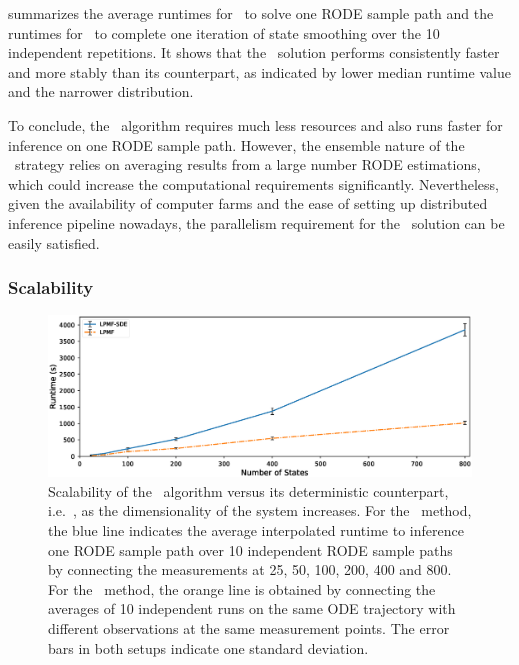  summarizes the average runtimes for \algolpmf\ to solve one RODE sample path and the runtimes for \algovgpamf\ to complete one iteration of state smoothing over the 10 independent repetitions.
It shows that the \algolpmfsde\ solution performs consistently faster and more stably than its counterpart, as indicated by lower median runtime value and the narrower distribution.

To conclude, the \algolpmfsde\ algorithm requires much less resources and also runs faster for inference on one RODE sample path.
However, the ensemble nature of the \algolpmfsde\ strategy relies on averaging results from a large number RODE estimations, which could increase the computational requirements significantly.
Nevertheless, given the availability of computer farms and the ease of setting up distributed inference pipeline nowadays, the parallelism requirement for the \algolpmfsde\ solution can be easily satisfied. 


\subsubsection*{Scalability}

\begin{figure}
    \centering
    \includegraphics[width=\textwidth]{graphics/lorenz-96-scalability}
    \caption{Scalability of the \algolpmfsde\ algorithm versus its deterministic counterpart, i.e.\ \algolpmf, as the dimensionality of the system increases. For the \algolpmfsde\ method, the blue line indicates the average interpolated runtime to inference one RODE sample path over 10 independent RODE sample paths by connecting the measurements at 25, 50, 100, 200, 400 and 800. For the \algolpmf\ method, the orange line is obtained by connecting the averages of 10 independent runs on the same ODE trajectory with different observations at the same measurement points. The error bars in both setups indicate one standard deviation.}
    \label{fig-lorenz-96-scalability}
\end{figure}

